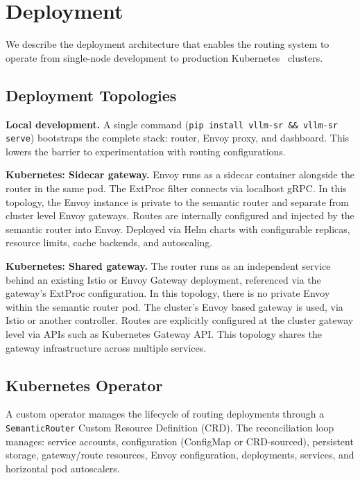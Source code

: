 
\section{Deployment}
\label{sec:deployment}

We describe the deployment architecture that enables the routing system to operate from single-node development to production Kubernetes~\cite{kubernetes2024} clusters.

\subsection{Deployment Topologies}

\noindent\textbf{Local development.}
A single command (\texttt{pip install vllm-sr \&\& vllm-sr serve}) bootstraps the complete stack: router, Envoy proxy, and dashboard.
This lowers the barrier to experimentation with routing configurations.

\noindent\textbf{Kubernetes: Sidecar gateway.}
Envoy runs as a sidecar container alongside the router in the same pod.
The ExtProc filter connects via localhost gRPC. In this topology, the Envoy instance is private to the semantic router and separate from cluster level Envoy gateways. Routes are internally configured and injected by the semantic router into Envoy.
Deployed via Helm charts with configurable replicas, resource limits, cache backends, and autoscaling.

\noindent\textbf{Kubernetes: Shared gateway.}
The router runs as an independent service behind an existing Istio or Envoy Gateway deployment, referenced via the gateway's ExtProc configuration. In this topology, there is no private Envoy within the semantic router pod. The cluster's Envoy based gateway is used, via Istio or another controller. Routes are explicitly configured at the cluster gateway level via APIs such as Kubernetes Gateway API.
This topology shares the gateway infrastructure across multiple services.

\subsection{Kubernetes Operator}

A custom operator manages the lifecycle of routing deployments through a \texttt{SemanticRouter} Custom Resource Definition (CRD).
The reconciliation loop manages: service accounts, configuration (ConfigMap or CRD-sourced), persistent storage, gateway/route resources, Envoy configuration, deployments, services, and horizontal pod autoscalers.

